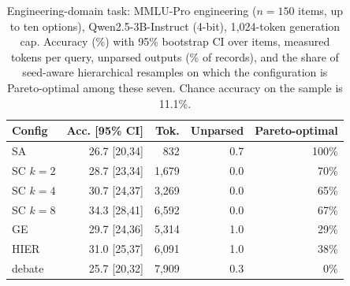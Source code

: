 \begin{table}[t]\centering\footnotesize
\caption{Engineering-domain task: MMLU-Pro engineering ($n{=}150$ items, up to ten options), Qwen2.5-3B-Instruct (4-bit), 1{,}024-token generation cap. Accuracy (\%) with 95\% bootstrap CI over items, measured tokens per query, unparsed outputs (\% of records), and the share of seed-aware hierarchical resamples on which the configuration is Pareto-optimal among these seven. Chance accuracy on the sample is 11.1\%.}
\label{tab:proeng}
\begin{tabular}{l r r r r}
\toprule
Config & Acc. [95\% CI] & Tok. & Unparsed & Pareto-optimal \\
\midrule
SA & 26.7 {\footnotesize[20,34]} & 832 & 0.7 & 100\% \\
SC $k{=}2$ & 28.7 {\footnotesize[23,34]} & 1{,}679 & 0.0 & 70\% \\
SC $k{=}4$ & 30.7 {\footnotesize[24,37]} & 3{,}269 & 0.0 & 65\% \\
SC $k{=}8$ & 34.3 {\footnotesize[28,41]} & 6{,}592 & 0.0 & 67\% \\
GE & 29.7 {\footnotesize[24,36]} & 5{,}314 & 1.0 & 29\% \\
HIER & 31.0 {\footnotesize[25,37]} & 6{,}091 & 1.0 & 38\% \\
debate & 25.7 {\footnotesize[20,32]} & 7{,}909 & 0.3 & 0\% \\
\bottomrule
\end{tabular}
\end{table}
